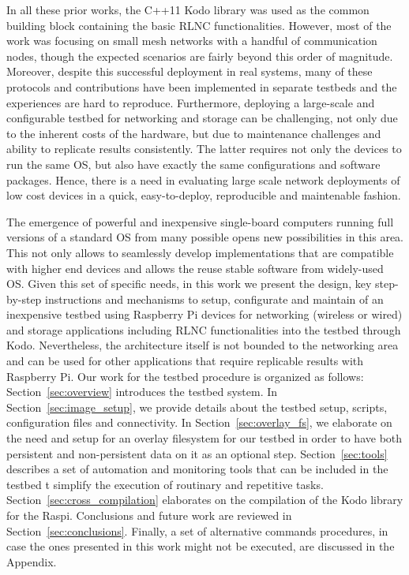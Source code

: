 In all these prior works, the C++11 Kodo library \cite{kodo2011pedersen} was used as the common building block containing the basic \ac{RLNC} functionalities. However, most of the work was focusing on small mesh networks with a handful of communication nodes, though the expected scenarios are fairly beyond this order of magnitude. Moreover, despite this successful deployment in real systems, many of these protocols and contributions have been implemented in separate testbeds and the experiences are hard to reproduce. Furthermore, deploying a large-scale and configurable testbed for networking and storage can be challenging, not only due to the inherent costs of the hardware, but due to maintenance challenges and ability to replicate results consistently. The latter requires not only the devices to run the same \ac{OS}, but also have exactly the same configurations and software packages. Hence, there is a need in evaluating large scale network deployments of low cost devices in a quick, easy-to-deploy, reproducible and maintenable fashion.

The emergence of powerful and inexpensive single-board computers running full versions of a standard \ac{OS} from many possible opens new possibilities in this area. This not only allows to seamlessly develop implementations that are compatible with higher end devices and allows the reuse stable software from widely-used \ac{OS}. Given this set of specific needs, in this work we present the design, key step-by-step instructions and mechanisms to setup, configurate and maintain of an inexpensive testbed using Raspberry Pi devices for networking (wireless or wired) and storage applications including \ac{RLNC} functionalities into the testbed through Kodo. Nevertheless, the architecture itself is not bounded to the networking area and can be used for other applications that require replicable results with Raspberry Pi. Our work for the testbed procedure is organized as follows: Section~\ref{sec:overview} introduces the testbed system. In Section~\ref{sec:image_setup}, we provide details about the testbed setup, scripts, configuration files and connectivity. In Section~\ref{sec:overlay_fs}, we elaborate on the need and setup for an overlay filesystem for our testbed in order to have both persistent and non-persistent data on it as an optional step. Section~\ref{sec:tools} describes a set of automation and monitoring tools that can be included in the testbed t simplify the execution of routinary and repetitive tasks. Section~\ref{sec:cross_compilation} elaborates on the compilation of the Kodo library for the \ac{Raspi}. Conclusions and future work are reviewed in Section~\ref{sec:conclusions}. Finally, a set of alternative commands procedures, in case the ones presented in this work might not be executed, are discussed in the Appendix.

